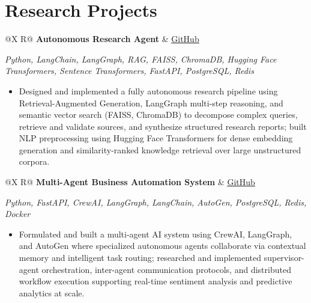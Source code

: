 \documentclass[a4paper,10pt]{article}
\newcommand{\ulink}[2]{\href{#1}{\uline{#2}}}
\newcommand{\subheading}[1]{{\color[HTML]{0A0A0A}\fontsize{12}{14}\selectfont\bfseries #1}}
\newcommand{\techstack}[1]{{\color[HTML]{5C5C5C}\fontsize{10.5}{12.5}\selectfont\itshape #1}}
\newcommand{\meta}[1]{{\color[HTML]{5C5C5C}\fontsize{10.5}{12.5}\selectfont #1}}
\begin{document}
\vspace{3pt}

\section{Research Projects}
\vspace{3pt}

\begin{tabularx}{\linewidth}{@{}X R@{}}
  \subheading{Autonomous Research Agent} &
  \meta{\ulink{https://github.com/su-jin1425/Autonomous-Research-Agent}{GitHub}}
\end{tabularx}
\vspace{1pt}
\techstack{Python, LangChain, LangGraph, RAG, FAISS, ChromaDB, Hugging Face Transformers, Sentence Transformers, FastAPI, PostgreSQL, Redis}
\begin{itemize}[nosep, leftmargin=1.5em, itemsep=2pt, topsep=3pt]
  \item {\color[HTML]{0A0A0A}\fontsize{11}{15}\selectfont Designed and implemented a fully autonomous research pipeline using Retrieval-Augmented Generation, LangGraph multi-step reasoning, and semantic vector search (FAISS, ChromaDB) to decompose complex queries, retrieve and validate sources, and synthesize structured research reports; built NLP preprocessing using Hugging Face Transformers for dense embedding generation and similarity-ranked knowledge retrieval over large unstructured corpora.}
\end{itemize}

\vspace{5pt}

\begin{tabularx}{\linewidth}{@{}X R@{}}
  \subheading{Multi-Agent Business Automation System} &
  \meta{\ulink{https://github.com/su-jin1425/Multi-Agent-Business-Automation}{GitHub}}
\end{tabularx}
\vspace{1pt}
\techstack{Python, FastAPI, CrewAI, LangGraph, LangChain, AutoGen, PostgreSQL, Redis, Docker}
\begin{itemize}[nosep, leftmargin=1.5em, itemsep=2pt, topsep=3pt]
  \item {\color[HTML]{0A0A0A}\fontsize{11}{15}\selectfont Formulated and built a multi-agent AI system using CrewAI, LangGraph, and AutoGen where specialized autonomous agents collaborate via contextual memory and intelligent task routing; researched and implemented supervisor-agent orchestration, inter-agent communication protocols, and distributed workflow execution supporting real-time sentiment analysis and predictive analytics at scale.}
\end{itemize}
\end{document}
